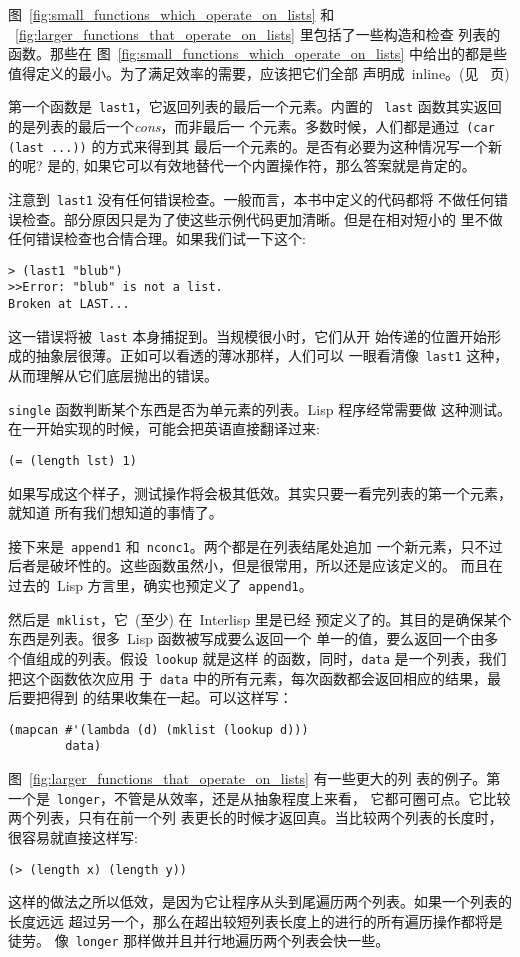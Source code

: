 图~\ref{fig:small_functions_which_operate_on_lists} 和
~\ref{fig:larger_functions_that_operate_on_lists} 里包括了一些构造和检查
列表的函数。那些在 图~\ref{fig:small_functions_which_operate_on_lists}
中给出的都是些值得定义的最小\utility{}。为了满足效率的需要，应该把它们全部
声明成~inline。(见~\pageref{page:inline_50th} 页)

第一个函数是~\texttt{last1}，它返回列表的最后一个元素。内置的
~\texttt{last} 函数其实返回的是列表的最后一个\emph{cons}，而非最后一
个元素。多数时候，人们都是通过~\texttt{(car (last ...))} 的方式来得到其
最后一个元素的。是否有必要为这种情况写一个新的\utility{}呢? 是的,
如果它可以有效地替代一个内置操作符，那么答案就是肯定的。

注意到~\texttt{last1} 没有任何错误检查。一般而言，本书中定义的代码都将
不做任何错误检查。部分原因只是为了使这些示例代码更加清晰。但是在相对短小的
\utility{}里不做任何错误检查也合情合理。如果我们试一下这个:
\begin{lstlisting}
> (last1 "blub")
>>Error: "blub" is not a list.
Broken at LAST...
\end{lstlisting}
这一错误将被~\texttt{last} 本身捕捉到。当\utility{}规模很小时，它们从开
始传递的位置开始形成的抽象层很薄。正如可以看透的薄冰那样，人们可以
一眼看清像~\texttt{last1} 这种\utility{}，从而理解从它们底层抛出的错误。

\texttt{single} 函数判断某个东西是否为单元素的列表。Lisp 程序经常需要做
这种测试。在一开始实现的时候，可能会把英语直接翻译过来:
\begin{lstlisting}
(= (length lst) 1)
\end{lstlisting}
如果写成这个样子，测试操作将会极其低效。其实只要一看完列表的第一个元素，就知道
所有我们想知道的事情了。

接下来是~\texttt{append1} 和~\texttt{nconc1}。两个都是在列表结尾处追加
一个新元素，只不过后者是破坏性的。这些函数虽然小，但是很常用，所以还是应该定义的。
而且在过去的~Lisp 方言里，确实也预定义了~\verb|append1|。

然后是~\texttt{mklist}\label{fun:mklist}，它~(至少) 在~Interlisp 里是已经
预定义了的。其目的是确保某个东西是列表。很多~Lisp 函数被写成要么返回一个
单一的值，要么返回一个由多个值组成的列表。假设~\texttt{lookup} 就是这样
的函数，同时，\texttt{data} 是一个列表，我们把这个函数依次应用
于~\texttt{data} 中的所有元素，每次函数都会返回相应的结果，最后要把得到
的结果收集在一起。可以这样写：
\begin{lstlisting}
(mapcan #'(lambda (d) (mklist (lookup d)))
        data)
\end{lstlisting}
图~\ref{fig:larger_functions_that_operate_on_lists} 有一些更大的列
表\utility{}的例子。第一个是~\texttt{longer}，不管是从效率，还是从抽象程度上来看，
它都可圈可点。它比较两个列表，只有在前一个列
表更长的时候才返回真。当比较两个列表的长度时，很容易就直接这样写:
\begin{lstlisting}
(> (length x) (length y))
\end{lstlisting}
这样的做法之所以低效，是因为它让程序从头到尾遍历两个列表。如果一个列表的长度远远
超过另一个，那么在超出较短列表长度上的进行的所有遍历操作都将是徒劳。
像~\texttt{longer} 那样做并且并行地遍历两个列表会快一些。


